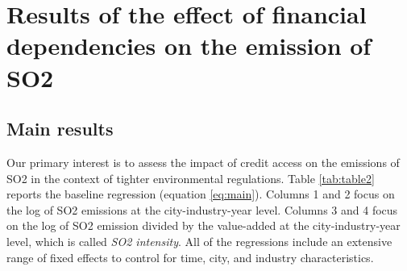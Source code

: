 \documentclass[12pt]{article}
\begin{document}
\section{Results of the effect of financial dependencies on the emission of SO2} \label{sec:result}

\subsection{Main results}

Our primary interest is to assess the impact of credit access on the emissions of SO2 in the context of tighter environmental regulations. Table \ref{tab:table2} reports the baseline regression (equation \ref{eq:main}). Columns 1 and 2 focus on the log of SO2 emissions at the city-industry-year level. Columns 3 and 4 focus on the log of SO2 emission divided by the value-added at the city-industry-year level, which is called \textit{SO2 intensity}. All of the regressions include an extensive range of fixed effects to control for time, city, and industry characteristics. 
\end{document}
